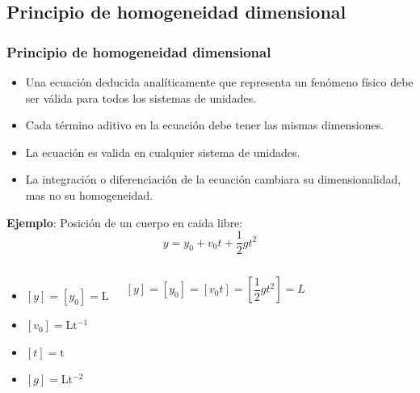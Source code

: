 \documentclass[t]{beamer}
\begin{document}
\subsection{Principio de homogeneidad dimensional}
\begin{frame}
\frametitle{Principio de homogeneidad dimensional}
\small
\begin{itemize}
\item Una ecuación deducida analíticamente que representa un fenómeno físico debe ser válida para todos los sistemas de unidades.
\item Cada t\'ermino aditivo en la ecuaci\'on debe tener las mismas dimensiones.
\item La ecuaci\'on es valida en cualquier sistema de unidades.
\item La integraci\'on o diferenciaci\'on de la ecuaci\'on cambiara su dimensionalidad, mas no su homogeneidad.
\end{itemize}
\vspace{0.2cm}

\begin{small}

 \textbf{Ejemplo}: Posici\'on de un cuerpo en caida libre:
\begin{equation}
y=y_0+v_0t+\frac{1}{2}gt^2
\end{equation}
\vspace{-0.9cm}

\begin{columns}[c]
\begin{itemize}
\item $[y] = [y_0] =  \mathrm{L}$
\item $[v_0]=\mathrm{Lt^{-1}} $
\item $[t]=\mathrm{t}$
\item $[g]=\mathrm{Lt^{-2}} $
\end{itemize}
$$[y] = [y_0] = [v_0t] = \left[\frac{1}{2}gt^2\right]  = L$$
\end{columns}
\end{small}
\end{frame}


\end{document}
